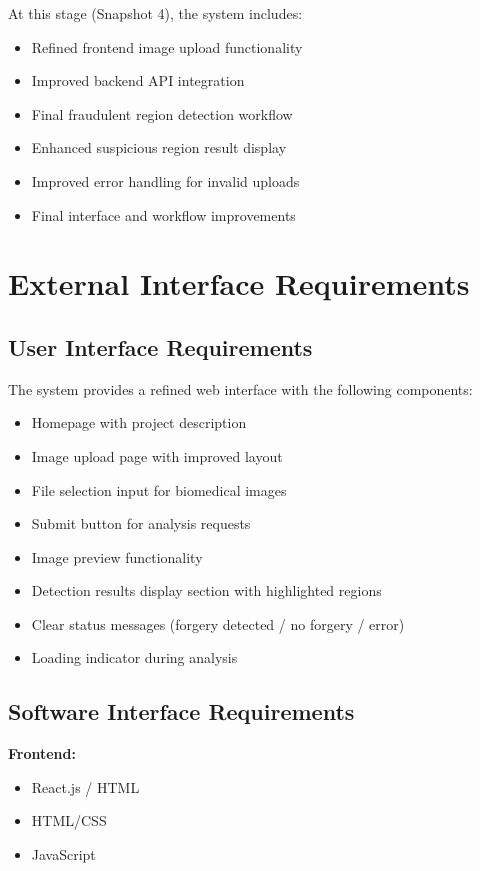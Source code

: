 \documentclass[12pt]{article}
\begin{document}
At this stage (Snapshot 4), the system includes:

\begin{itemize}
    \item Refined frontend image upload functionality
    \item Improved backend API integration
    \item Final fraudulent region detection workflow
    \item Enhanced suspicious region result display
    \item Improved error handling for invalid uploads
    \item Final interface and workflow improvements
\end{itemize}

\section{External Interface Requirements}

\subsection{User Interface Requirements}

The system provides a refined web interface with the following components:

\begin{itemize}
    \item Homepage with project description
    \item Image upload page with improved layout
    \item File selection input for biomedical images
    \item Submit button for analysis requests
    \item Image preview functionality
    \item Detection results display section with highlighted regions
    \item Clear status messages (forgery detected / no forgery / error)
    \item Loading indicator during analysis
\end{itemize}

\subsection{Software Interface Requirements}

\textbf{Frontend:}

\begin{itemize}
    \item React.js / HTML
    \item HTML/CSS
    \item JavaScript
\end{itemize}
\end{document}
